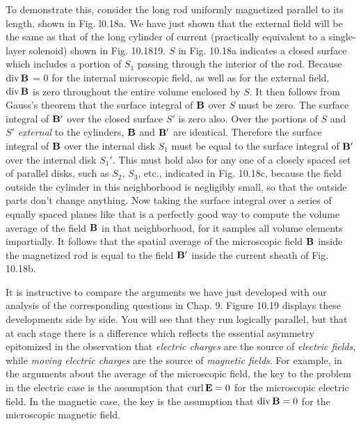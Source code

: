 To demonstrate this, consider the long rod uniformly magnetized
parallel to its length, shown in Fig. l0.18a. We have just shown that
the external field will be the same as that of the long cylinder of current
(practically equivalent to a single-layer solenoid) shown in
Fig. 10.1819. $S$ in Fig. 10.18a indicates a closed surface which includes
a portion of $S_1$ passing through the interior of the rod.
Because $\operatorname{div}\mathbf{B}$ = 0 for the internal microscopic field, as well as for
the external field, $\operatorname{div}\mathbf{B}$ is zero throughout the entire volume enclosed
by $S$. It then follows from Gauss's theorem that the surface integral
of $\mathbf{B}$ over $S$ must be zero. The surface integral of $\mathbf{B}'$ over the closed
surface $S'$ is zero also. Over the portions of $S$ and $S'$ \emph{external} to the
cylinders, $\mathbf{B}$ and $\mathbf{B}'$ are identical. Therefore the surface integral of $\mathbf{B}$
over the internal disk $S_1$ must be equal to the surface integral of $\mathbf{B}'$
over the internal disk $S_1'$. This must hold also for any one of a closely
spaced set of parallel disks, such as $S_2$, $S_3$, etc., indicated in
Fig. 10.18c, because the field outside the cylinder in this neighborhood
is negligibly small, so that the outside parts don't change 
anything. Now taking the surface integral over a series of equally spaced
planes like that is a perfectly good way to compute the volume
average of the field $\mathbf{B}$ in that neighborhood, for it samples all volume
elements impartially. It follows that the spatial average of the microscopic
field $\mathbf{B}$ inside the magnetized rod is equal to the field $\mathbf{B}'$ inside
the current sheath of Fig. 10.18b.

It is instructive to compare the arguments we have just developed
with our analysis of the corresponding questions in Chap. 9. Figure
10.19 displays these developments side by side. You will see that
they run logically parallel, but that at each stage there is a difference
which reflects the essential asymmetry epitomized in the observation
that \emph{electric charges} are the source of \emph{electric fields}, while \emph{moving
electric charges} are the source of \emph{magnetic fields}. For example, in
the arguments about the average of the microscopic field, the key
to the problem in the electric case is the assumption that $\operatorname{curl}\mathbf{E} = 0$
for the microscopic electric field. In the magnetic case, the key is
the assumption that $\operatorname{div}\mathbf{B} = 0$ for the microscopic magnetic field.



